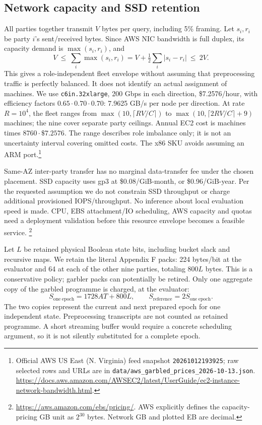 \subsection{Network capacity and SSD retention}
All parties together transmit $V$ bytes per query, including 5\% framing.
Let $s_i,r_i$ be party $i$'s sent/received bytes. Since AWS NIC bandwidth is
full duplex, its capacity demand is $\max(s_i,r_i)$, and
\[
 V\ \leq\ \sum_i\max(s_i,r_i)
   =V+\tfrac12\sum_i|s_i-r_i|\ \leq\ 2V.
\]
This gives a role-independent fleet envelope without assuming that preprocessing
traffic is perfectly balanced. It does not identify an actual assignment of
machines. We use \texttt{c6in.32xlarge}, 200 Gbps in each direction,
\$7.2576/hour, with efficiency factors $0.65\cdot0.70\cdot0.70$:
7.9625 GB/s per node per direction. At rate $R=10^4$, the fleet ranges from
$\max(10,\lceil RV/C\rceil)$ to
$\max(10,\lceil2RV/C\rceil+9)$ machines; the nine cover separate party ceilings.
Annual EC2 cost is machines times $8760\cdot\$7.2576$. The range describes
role imbalance only; it is not an uncertainty interval covering omitted costs.
The x86 SKU avoids assuming an ARM port.\footnote{Official AWS US East
(N. Virginia) feed snapshot \texttt{20261012193925}; raw selected rows and URLs
are in \texttt{data/aws\_garbled\_prices\_2026-10-13.json}.
\url{https://docs.aws.amazon.com/AWSEC2/latest/UserGuide/ec2-instance-network-bandwidth.html}.}

Same-AZ inter-party transfer has no marginal data-transfer fee under the chosen
placement. SSD capacity uses gp3 at \$0.08/GiB-month, or \$0.96/GiB-year. Per the
requested assumption we do not constrain SSD throughput or charge additional
provisioned IOPS/throughput. No inference about local evaluation speed is made.
CPU, EBS attachment/IO scheduling, AWS capacity and quotas need a deployment
validation before this resource envelope becomes a feasible service.
\footnote{\url{https://aws.amazon.com/ebs/pricing/}. AWS explicitly defines the
capacity-pricing GB unit as $2^{30}$ bytes. Network GB and plotted EB are decimal.}

Let $L$ be retained physical Boolean state bits, including bucket slack and
recursive maps. We retain the literal Appendix F packs: 224 bytes/bit at the
evaluator and 64 at each of the other nine parties, totaling $800L$ bytes.
This is a conservative policy; garbler packs can potentially be retired.
Only one aggregate copy of the garbled programme is charged, at the evaluator:
\[
 S_{\mathrm{one\ epoch}}=1728AT+800L,\qquad
 S_{\mathrm{reference}}=2S_{\mathrm{one\ epoch}}.
\]
The two copies represent the current and next prepared epoch for one independent
state. Preprocessing transcripts are not counted as retained programme. A
short streaming buffer would require a concrete scheduling argument, so it is
not silently substituted for a complete epoch.

